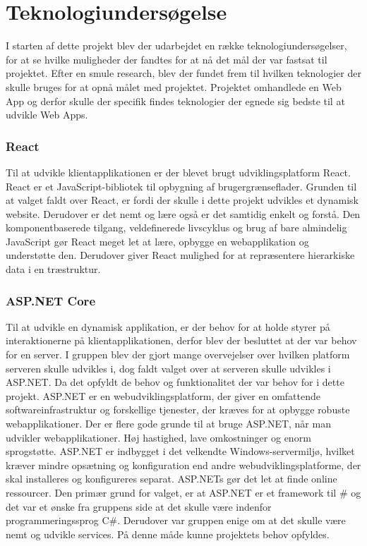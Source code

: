 \chapter{Teknologiundersøgelse}

I starten af dette projekt blev der udarbejdet en række teknologiundersøgelser, for at se hvilke muligheder der fandtes for at nå det mål der var fastsat til projektet. Efter en smule research, blev der fundet frem til hvilken teknologier der skulle bruges for at opnå målet med projektet. Projektet omhandlede en Web App og derfor skulle der specifik findes teknologier der egnede sig bedste til at udvikle Web Apps.     

\subsection{React}

Til at udvikle klientapplikationen er der blevet brugt udviklingsplatform React. React er et JavaScript-bibliotek til opbygning af brugergrænseflader. Grunden til at valget faldt over React, er fordi der skulle i dette projekt udvikles
et dynamisk website. Derudover er det nemt og lære også er det samtidig enkelt og forstå. Den komponentbaserede tilgang, veldefinerede livscyklus og brug af bare almindelig JavaScript gør React meget let at lære, opbygge en webapplikation og understøtte den. Derudover giver React mulighed for at repræsentere hierarkiske data i en træstruktur.

\subsection{ASP.NET Core}

Til at udvikle en dynamisk applikation, er der behov for at holde styrer på interaktionerne på klientapplikationen, derfor blev der besluttet at der var behov for en server. 
I gruppen blev der gjort mange overvejelser over hvilken platform serveren skulle udvikles i, dog faldt valget over at serveren skulle udvikles i ASP.NET. Da det opfyldt de behov og funktionalitet der var behov for i dette projekt. ASP.NET er en webudviklingsplatform, der giver en omfattende softwareinfrastruktur og forskellige tjenester, der kræves for at opbygge robuste webapplikationer. 
Der er flere gode grunde til at bruge ASP.NET, når man udvikler webapplikationer. Høj hastighed, lave omkostninger og enorm sprogstøtte. ASP.NET er indbygget i det velkendte Windows-servermiljø, hvilket kræver mindre opsætning og konfiguration end andre webudviklingsplatforme, der skal installeres og konfigureres separat. ASP.NETs gør det let at finde online ressourcer. 
Den primær grund for valget, er at ASP.NET er et framework til \C# og det var et ønske fra gruppens side at det skulle være indenfor programmeringssprog C#. Derudover var gruppen enige om at det skulle være nemt og udvikle services. På denne måde kunne projektets behov opfyldes. 


